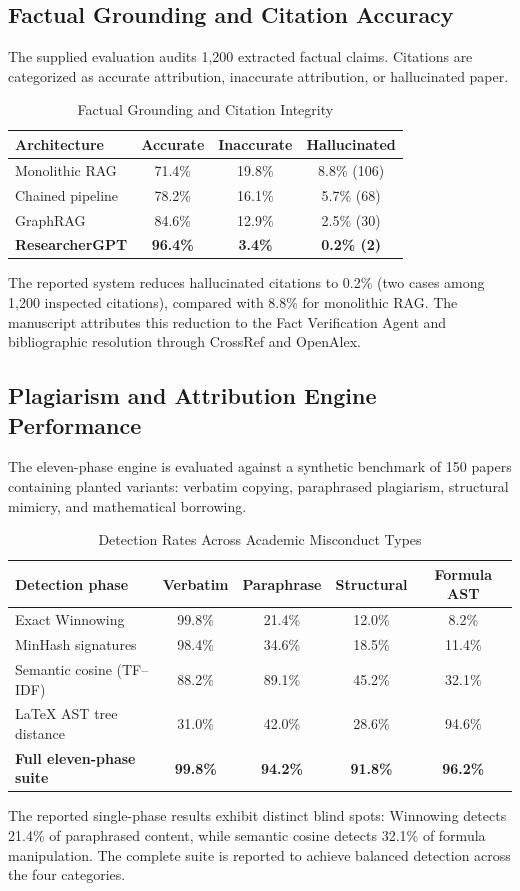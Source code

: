 \documentclass[conference]{IEEEtran}
\begin{document}
\subsection{Factual Grounding and Citation Accuracy}
The supplied evaluation audits 1,200 extracted factual claims. Citations are categorized as accurate attribution, inaccurate attribution, or hallucinated paper.
\begin{table}[!t]
\caption{Factual Grounding and Citation Integrity}
\label{tab:citation}
\centering
\footnotesize
\begin{tabular}{@{}lccc@{}}
\toprule
\textbf{Architecture} & \textbf{Accurate} & \textbf{Inaccurate} & \textbf{Hallucinated}\\
\midrule
Monolithic RAG & 71.4\% & 19.8\% & 8.8\% (106)\\
Chained pipeline & 78.2\% & 16.1\% & 5.7\% (68)\\
GraphRAG & 84.6\% & 12.9\% & 2.5\% (30)\\
\textbf{ResearcherGPT} & \textbf{96.4\%} & \textbf{3.4\%} & \textbf{0.2\% (2)}\\
\bottomrule
\end{tabular}
\end{table}
The reported system reduces hallucinated citations to 0.2\% (two cases among 1,200 inspected citations), compared with 8.8\% for monolithic RAG. The manuscript attributes this reduction to the Fact Verification Agent and bibliographic resolution through CrossRef and OpenAlex.
\subsection{Plagiarism and Attribution Engine Performance}
The eleven-phase engine is evaluated against a synthetic benchmark of 150 papers containing planted variants: verbatim copying, paraphrased plagiarism, structural mimicry, and mathematical borrowing.
\begin{table}[!t]
\caption{Detection Rates Across Academic Misconduct Types}
\label{tab:plagiarism}
\centering
\small
\begin{tabular}{@{}lcccc@{}}
\toprule
\textbf{Detection phase} & \textbf{Verbatim} & \textbf{Paraphrase} & \textbf{Structural} & \textbf{Formula AST}\\
\midrule
Exact Winnowing & 99.8\% & 21.4\% & 12.0\% & 8.2\%\\
MinHash signatures & 98.4\% & 34.6\% & 18.5\% & 11.4\%\\
Semantic cosine (TF--IDF) & 88.2\% & 89.1\% & 45.2\% & 32.1\%\\
LaTeX AST tree distance & 31.0\% & 42.0\% & 28.6\% & 94.6\%\\
\textbf{Full eleven-phase suite} & \textbf{99.8\%} & \textbf{94.2\%} & \textbf{91.8\%} & \textbf{96.2\%}\\
\bottomrule
\end{tabular}
\end{table}
The reported single-phase results exhibit distinct blind spots: Winnowing detects 21.4\% of paraphrased content, while semantic cosine detects 32.1\% of formula manipulation. The complete suite is reported to achieve balanced detection across the four categories.
\end{document}
